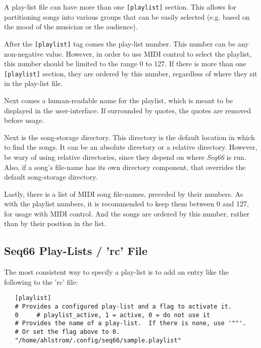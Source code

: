    A play-list file can have more than one \texttt{[playlist]} section.  This
   allows for partitioning songs into various groups that can be easily
   selected (e.g. based on the mood of the musician or the audience).

   After the \texttt{[playlist]} tag comes the play-list number.
   This number can be any non-negative value.
   However, in order to use MIDI control to select the playlist, this number
   should be limited to the range 0 to 127.
   If there is more than one \texttt{[playlist]} section, they are ordered by
   this number, regardless of where they sit in the play-list file.

   Next comes a human-readable name for the playlist, which is meant to be
   displayed in the user-interface.  If surrounded by quotes, the quotes are
   removed before usage.

   Next is the song-storage directory.
   This directory is the default location in which to find the songs.
   It can be an absolute directory or a relative directory.
   However, be wary of using relative directories, since they depend on where
   \textsl{Seq66} is run.
   Also, if a song's file-name  has its own directory component, that overrides
   the default song-storage directory.

   Lastly, there is a list of MIDI song file-names, preceded by their numbers.
   As with the playlist numbers, it is recommended to keep them between 0 and
   127, for usage with MIDI control.  And the songs are ordered by this number,
   rather than by their position in the list.

\subsection{Seq66 Play-Lists / 'rc' File}
\label{subsec:playlist_rc_file}

   The most consistent way to specify a play-list is to add an entry like the
   following to the 'rc' file:

   \begin{verbatim}
   [playlist]
   # Provides a configured play-list and a flag to activate it.
   0     # playlist_active, 1 = active, 0 = do not use it
   # Provides the name of a play-list.  If there is none, use '""'.
   # Or set the flag above to 0.
   "/home/ahlstrom/.config/seq66/sample.playlist"
   \end{verbatim}


